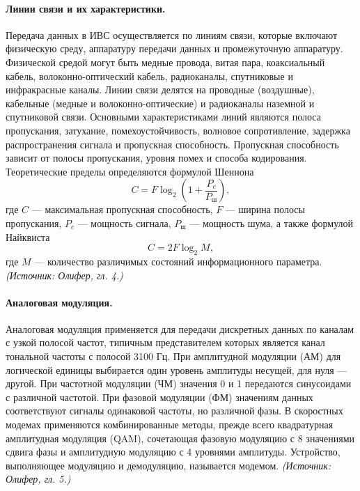\documentclass[a4paper,12pt]{article}
\begin{document}
\paragraph{Линии связи и их характеристики.}
Передача данных в ИВС осуществляется по линиям связи, которые включают физическую среду, аппаратуру передачи данных и промежуточную аппаратуру. Физической средой могут быть медные провода, витая пара, коаксиальный кабель, волоконно-оптический кабель, радиоканалы, спутниковые и инфракрасные каналы. Линии связи делятся на проводные (воздушные), кабельные (медные и волоконно-оптические) и радиоканалы наземной и спутниковой связи. Основными характеристиками линий являются полоса пропускания, затухание, помехоустойчивость, волновое сопротивление, задержка распространения сигнала и пропускная способность. Пропускная способность зависит от полосы пропускания, уровня помех и способа кодирования. Теоретические пределы определяются формулой Шеннона
\[
C = F \log_2\left(1 + \frac{P_c}{P_{\text{ш}}}\right),
\]
где \(C\) — максимальная пропускная способность, \(F\) — ширина полосы пропускания, \(P_c\) — мощность сигнала, \(P_{\text{ш}}\) — мощность шума, а также формулой Найквиста
\[
C = 2F \log_2 M,
\]
где \(M\) — количество различимых состояний информационного параметра.
\textit{(Источник: Олифер, гл. 4.)}

\paragraph{Аналоговая модуляция.}
Аналоговая модуляция применяется для передачи дискретных данных по каналам с узкой полосой частот, типичным представителем которых является канал тональной частоты с полосой 3100 Гц. При амплитудной модуляции (АМ) для логической единицы выбирается один уровень амплитуды несущей, для нуля — другой. При частотной модуляции (ЧМ) значения 0 и 1 передаются синусоидами с различной частотой. При фазовой модуляции (ФМ) значениям данных соответствуют сигналы одинаковой частоты, но различной фазы. В скоростных модемах применяются комбинированные методы, прежде всего квадратурная амплитудная модуляция (QAM), сочетающая фазовую модуляцию с 8 значениями сдвига фазы и амплитудную модуляцию с 4 уровнями амплитуды. Устройство, выполняющее модуляцию и демодуляцию, называется модемом.
\textit{(Источник: Олифер, гл. 5.)}
\end{document}
